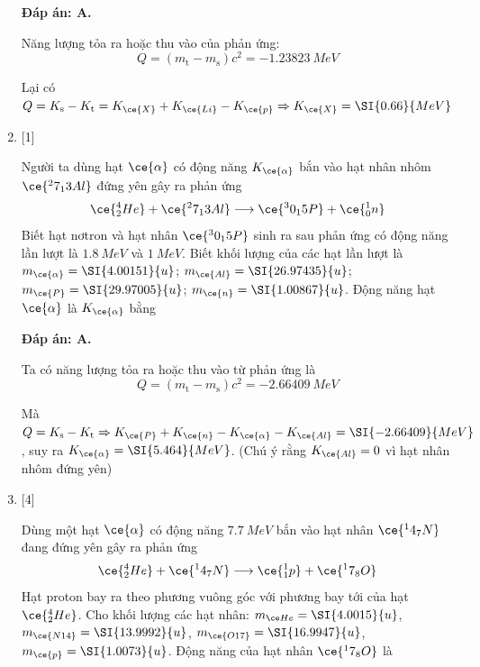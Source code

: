\begin{enumerate}[label=\bfseries Câu \arabic*:]
	\loigiai
	{		\textbf{Đáp án: A.}
		
		Năng lượng tỏa ra hoặc thu vào của phản ứng:
		$$Q=(m_\text{t} - m_\text{s})c^2 = \SI{-1.23823}{MeV}$$
		
		Lại có $Q=K_{\text{s}} - K_{\text{t}} = K_{\ce{X}} + K_{\ce{Li}} - K_{\ce{p}} \Rightarrow K_{\ce{X}} = \SI{0.66}{MeV}$
		
	}
	\item {} [1]
	\cauhoi
	{Người ta dùng hạt $\ce{\alpha}$ có động năng $K_{\ce{\alpha}}$ bắn vào hạt nhân nhôm $\ce{^27_13 Al}$ đứng yên gây ra phản ứng 
		$$\ce{^4_2 He} + \ce{^27_13 Al} \longrightarrow \ce{^30_15 P} + \ce{^1_0 n}$$
		Biết hạt nơtron và hạt nhân $\ce{^30_15 P}$ sinh ra sau phản ứng có động năng lần lượt là $\SI{1.8}{MeV}$ và $\SI{1}{MeV}$. Biết khối lượng của các hạt lần lượt là $m_{\ce{\alpha}} = \SI{4.00151}{u}$; $m_{\ce{Al}} = \SI{26.97435}{u}$; $m_{\ce{P}} = \SI{29.97005}{u}$; $m_{\ce{n}} = \SI{1.00867}{u}$. Động năng hạt $\ce{\alpha}$ là $K_{\ce{\alpha}}$ bằng
	}
	
	\loigiai
	{		\textbf{Đáp án: A.}
		
		Ta có năng lượng tỏa ra hoặc thu vào từ phản ứng là
		$$Q=(m_\text{t} - m_\text{s})c^2 = \SI{-2.66409}{MeV}$$
		
		Mà $Q=K_\text{s} - K_\text{t} \Rightarrow K_{\ce{P}} + K_{\ce{n}} - K_{\ce{\alpha}} - K_{\ce{Al}} = \SI{-2.66409}{MeV}$, suy ra $K_{\ce{\alpha}} = \SI{5.464}{MeV}$. (Chú ý rằng $K_{\ce{Al}}=0$ vì hạt nhân nhôm đứng yên)
	}
	\item {} [4]
	\cauhoi
	{Dùng một hạt $\ce{\alpha}$ có động năng $\SI{7.7}{MeV}$ bắn vào hạt nhân $\ce{^14_7 N}$ đang đứng yên gây ra phản ứng
		$$\ce{^4_2 He} + \ce{^14_7 N} \longrightarrow \ce{^1_1 p} + \ce{^17_8 O}$$
		Hạt proton bay ra theo phương vuông góc với phương bay tới của hạt $\ce{^4_2 He}$. Cho khối lượng các hạt nhân: $m_{\ce He} = \SI{4.0015}{u}$, $m_{\ce{N 14}} = \SI{13.9992}{u}$, $m_{\ce{O 17}} = \SI{16.9947}{u}$, $m_{\ce{p}} = \SI{1.0073}{u}$. Động năng của hạt nhân $\ce{^17_8 O}$ là
	}
	

\end{enumerate}
